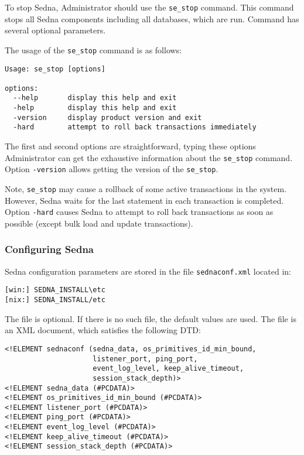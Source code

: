 \documentclass[a4paper,12pt]{article}
\begin{document}
To stop Sedna, Administrator should use the \verb!se_stop! command. This command
stops all Sedna components including all databases, which are run. Command has
several optional parameters.

The usage of the \verb!se_stop! command is as follows:

\small{
\begin{verbatim}
Usage: se_stop [options]

options:
  --help       display this help and exit
  -help        display this help and exit
  -version     display product version and exit
  -hard        attempt to roll back transactions immediately
\end{verbatim}}

The first and second options are straightforward, typing these options
Administrator can get the exhaustive information about the \verb!se_stop!
command. Option \verb!-version! allows getting the version of the
\verb!se_stop!.

Note, \verb!se_stop! may cause a rollback of some active transactions in the
system. However, Sedna waits for the last statement in each transaction is
completed. Option \verb!-hard! causes Sedna to attempt to roll back transactions
as soon as possible (except bulk load and update transactions).


\subsubsection{Configuring Sedna}
\label{sec:ConfigSedna}
Sedna configuration parameters are stored in the file \verb!sednaconf.xml!
located in:

\begin{verbatim}
[win:] SEDNA_INSTALL\etc
[nix:] SEDNA_INSTALL/etc
\end{verbatim}

The file is optional. If there is no such file, the default values are used.
The file is an XML document, which satisfies the following DTD:

\small{
\begin{verbatim}
<!ELEMENT sednaconf (sedna_data, os_primitives_id_min_bound,
                     listener_port, ping_port,
                     event_log_level, keep_alive_timeout,
                     session_stack_depth)>
<!ELEMENT sedna_data (#PCDATA)>
<!ELEMENT os_primitives_id_min_bound (#PCDATA)>
<!ELEMENT listener_port (#PCDATA)>
<!ELEMENT ping_port (#PCDATA)>
<!ELEMENT event_log_level (#PCDATA)>
<!ELEMENT keep_alive_timeout (#PCDATA)>
<!ELEMENT session_stack_depth (#PCDATA)>
\end{verbatim}}
\end{document}
